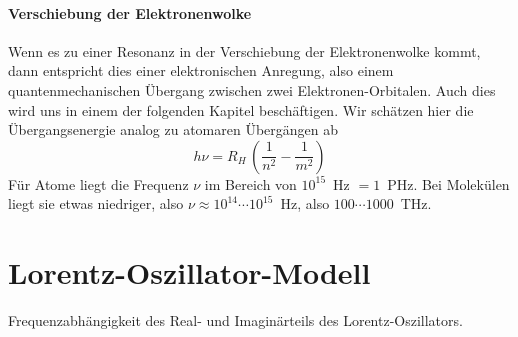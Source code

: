 \paragraph{Verschiebung der Elektronenwolke} Wenn es zu einer Resonanz in der Verschiebung der Elektronenwolke kommt, dann entspricht dies einer elektronischen Anregung, also einem quantenmechanischen Übergang zwischen zwei Elektronen-Orbitalen. Auch dies wird uns in einem der folgenden Kapitel beschäftigen. Wir schätzen hier die Übergangsenergie analog zu atomaren Übergängen ab
\begin{equation}
  h \nu = R_H \, \left( \frac{1}{n^2} - \frac{1}{m^2} \right)
\end{equation}
Für Atome liegt die Frequenz $\nu$ im Bereich von $10^{15}$~Hz $= 1$~PHz. Bei Molekülen liegt sie etwas niedriger, also $\nu \approx 10^{14} \cdots 10^{15}$~Hz, also $100 \cdots 1000$~THz.


\section{Lorentz-Oszillator-Modell}


\begin{marginfigure}

\caption{Frequenzabhängigkeit des Real- und Imaginärteils des Lorentz-Oszillators.}
\end{marginfigure}

